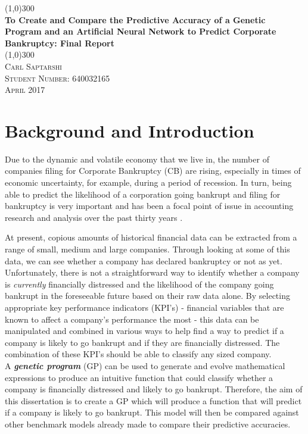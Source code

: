 \documentclass[11pt]{article}
\begin{document}
	\begin{titlepage}
		\begin{center}
			\line(1,0){300}\\
			[0.25in]
			\huge{\bfseries To Create and Compare the Predictive Accuracy of a Genetic Program and an Artificial Neural Network to Predict Corporate Bankruptcy: Final Report}\\
			\line(1,0){300}\\
			[1.5cm]
			
			 \textsc{Carl Saptarshi}\\
			 \textsc{\large  Student Number: 640032165 \\
			 April 2017}
			 
		\end{center}
	\end{titlepage}

\tableofcontents
\thispagestyle{empty}

\cleardoublepage
\setcounter{page}{1}
\section{Background and Introduction }\label{sec:intro}


Due to the dynamic and volatile economy that we live in, the number of companies filing for Corporate Bankruptcy (CB) are rising, especially in times of economic uncertainty, for example, during a period of recession. In turn, being able to predict the likelihood of a corporation going bankrupt and filing for bankruptcy is very important and has been a focal point of issue in accounting research and analysis over the past thirty years \cite{?}.

At present, copious amounts of historical financial data can be extracted from a range of small, medium and large companies. Through looking at some of this data, we can see whether a company has declared bankruptcy or not as yet. Unfortunately, there is not a straightforward way to identify whether a company is \textit{currently} financially distressed and the likelihood of the company going bankrupt in the foreseeable future based on their raw data alone. By selecting appropriate key performance indicators (KPI's) - financial variables that are known to affect a company's performance the most - this data can be manipulated and combined in various ways to help find a way to predict if a company is likely to go bankrupt and if they are financially distressed. The combination of these KPI's should be able to classify any sized company. \\
A \textbf{\textit{genetic program}} (GP) can be used to generate and evolve mathematical expressions to produce an intuitive function that could classify whether a company is financially distressed and likely to go bankrupt. Therefore, the aim of this dissertation is to create a GP which will produce a function that will predict if a company is likely to go bankrupt. This model will then be compared against other benchmark models already made to compare their predictive accuracies. \\
\end{document}
